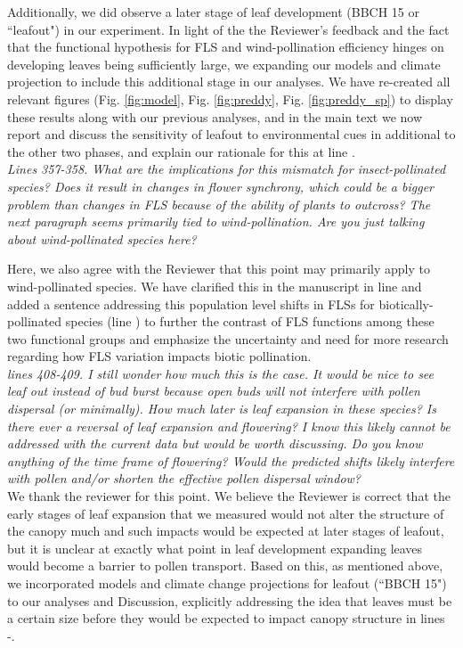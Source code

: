 \documentclass[11pt]{article}
\begin{document}
\noindent Additionally, we did observe a later stage of leaf development (BBCH 15 or ``leafout") in our experiment. In light of the the Reviewer's feedback and the fact that the functional hypothesis for FLS and wind-pollination efficiency hinges on developing leaves being sufficiently large, we expanding our models and climate projection to include this additional stage in our analyses. We have re-created all relevant figures (Fig. \ref{fig:model}, Fig. \ref{fig:preddy}, Fig. \ref{fig:preddy_sp}) to display these results along with our previous analyses, and in the main text we now report and discuss the sensitivity of leafout to environmental cues in additional to the other two phases, and explain our rationale for this at line .\\ 

\emph{Lines  357-358. What are the implications for this mismatch for insect-pollinated species? Does it result in changes in flower synchrony, which could be a bigger problem than changes in FLS because of the ability of plants to outcross? The next paragraph seems primarily tied to wind-pollination. Are you just talking about wind-pollinated species here?}
 
\noindent Here, we also agree with the Reviewer that this point may primarily apply to wind-pollinated species. We have clarified this in the manuscript in line  and added a sentence addressing this population level shifts in FLSs for biotically-pollinated species (line ) to further the contrast of FLS functions among these two functional groups and emphasize the uncertainty and need for more research regarding how FLS variation impacts biotic pollination. \\
 
\emph{lines 408-409. I still wonder how much this is the case. It would be nice to see leaf out instead of bud burst because open buds will not interfere with pollen dispersal (or minimally). How much later is leaf expansion in these species? Is there ever a reversal of leaf expansion and flowering? I know this likely cannot be addressed with the current data but would be worth discussing. Do you know anything of the time frame of flowering? Would the predicted shifts likely interfere with pollen and/or shorten the effective pollen dispersal window?}\\

\noindent We thank the reviewer for this point. We believe the Reviewer is correct that the early stages of leaf expansion that we measured would not alter the structure of the canopy much and such impacts would be expected at later stages of leafout, but it is unclear at exactly what point in leaf development expanding leaves would become a barrier to pollen transport.
Based on this, as mentioned above, we incorporated models and climate change projections for leafout (``BBCH 15") to our analyses and Discussion, explicitly addressing the idea that leaves must be a certain size before they would be expected to impact canopy structure in lines -.\\
\end{document}
